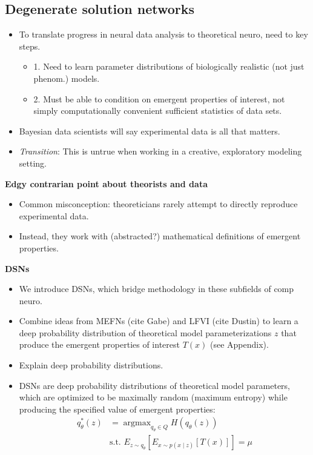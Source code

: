 \documentclass[11pt]{article}
\DeclareMathOperator*{\argmax}{argmax}
\begin{document}
\subsection{Degenerate solution networks}
\begin{itemize}
\item To translate progress in neural data analysis to theoretical neuro, need to key steps.
\begin{itemize}
\item 1. Need to learn parameter distributions of biologically realistic (not just phenom.) models.
\item 2. Must be able to condition on emergent properties of interest, not simply computationally convenient sufficient statistics of data sets.
\end{itemize}
\item Bayesian data scientists will say experimental data is all that matters.  
\item \textit{Transition}: This is untrue when working in a creative, exploratory modeling setting.
\end{itemize}

\textbf{Edgy contrarian point about theorists and data}
\begin{itemize}
\item Common misconception: theoreticians rarely attempt to directly reproduce experimental data. 
\item Instead, they work with (abstracted?) mathematical definitions of emergent properties.  
\end{itemize}

\textbf{DSNs}
\begin{itemize}
\item We introduce DSNs, which bridge methodology in these subfields of comp neuro.
\item  Combine ideas from MEFNs (cite Gabe) and LFVI (cite Dustin) to learn a deep probability distribution of theoretical model parameterizations $z$ that produce the emergent properties of interest $T(x)$ (see Appendix).  
\item Explain deep probability distributions.
\item DSNs are deep probability distributions of theoretical model parameters, which are optimized to be maximally random (maximum entropy) while producing the specified value of emergent properties:
\begin{equation}
\begin{split}
q_\theta^*(z) &= \argmax_{q_\theta \in Q} H(q_\theta(z)) \\
 &  \text{s.t.  } E_{z \sim q_\theta}\left[ E_{x\sim p(x \mid z)}\left[T(x)\right] \right] = \mu \\
 \end{split}
\end{equation}
\end{itemize}
\end{document}
